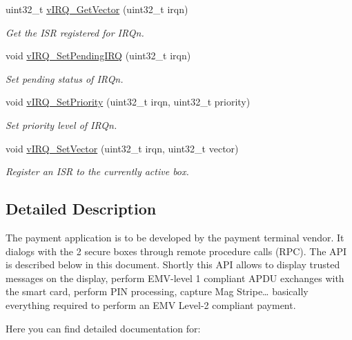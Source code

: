 \begin{DoxyCompactItemize}
uint32\+\_\+t \hyperlink{group__hypervisor_gaaa9c852e90077dd4c553240d769b3658}{v\+I\+R\+Q\+\_\+\+Get\+Vector} (uint32\+\_\+t irqn)
\begin{DoxyCompactList}\small\item\em Get the I\+SR registered for I\+R\+Qn. \end{DoxyCompactList}\item
void \hyperlink{group__hypervisor_gab5570c2fa5a04a3a183cdef960a43c6b}{v\+I\+R\+Q\+\_\+\+Set\+Pending\+I\+RQ} (uint32\+\_\+t irqn)
\begin{DoxyCompactList}\small\item\em Set pending status of I\+R\+Qn. \end{DoxyCompactList}\item
void \hyperlink{group__hypervisor_ga3c725e15df2f30fdaed9f1873a7eebdf}{v\+I\+R\+Q\+\_\+\+Set\+Priority} (uint32\+\_\+t irqn, uint32\+\_\+t priority)
\begin{DoxyCompactList}\small\item\em Set priority level of I\+R\+Qn. \end{DoxyCompactList}\item
void \hyperlink{group__hypervisor_ga3bf7917bc9150d1b91bec5d41962ff13}{v\+I\+R\+Q\+\_\+\+Set\+Vector} (uint32\+\_\+t irqn, uint32\+\_\+t vector)
\begin{DoxyCompactList}\small\item\em Register an I\+SR to the currently active box. \end{DoxyCompactList}\end{DoxyCompactItemize}


\subsection{Detailed Description}
The payment application is to be developed by the payment terminal vendor. It dialogs with the 2 secure boxes through remote procedure calls (R\+PC). The A\+PI is described below in this document. Shortly this A\+PI allows to display trusted messages on the display, perform E\+M\+V-\/level 1 compliant A\+P\+DU exchanges with the smart card, perform P\+IN processing, capture Mag Stripe… basically everything required to perform an E\+MV Level-\/2 compliant payment.

Here you can find detailed documentation for\+:


